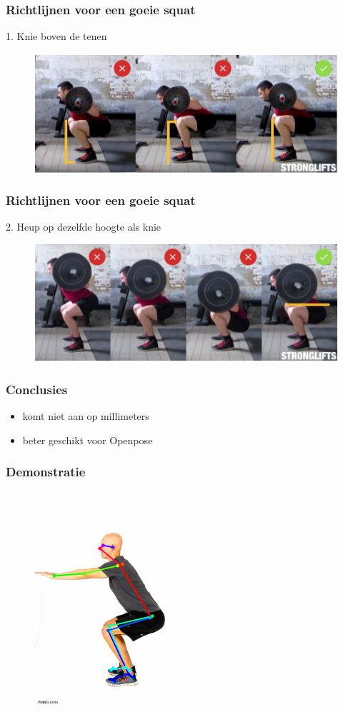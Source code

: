 \documentclass
   [kulak] %
   {kulakbeamer}
\begin{document}
\begin{frame}
	\frametitle{Richtlijnen voor een goeie squat}
	1. Knie boven de tenen
	\begin{figure}
		\includegraphics[width= \textwidth]{squat_knie}
	\end{figure}
\end{frame}

\begin{frame}
\frametitle{Richtlijnen voor een goeie squat}
2. Heup op dezelfde hoogte als knie
\begin{figure}
	\includegraphics[width= \textwidth]{squat_heup}
\end{figure}
\end{frame}

\begin{frame}
	\frametitle{Conclusies}
	\begin{itemize}
		\item komt niet aan op millimeters
		\item beter geschikt voor Openpose
	\end{itemize}
\end{frame}

\begin{frame}
	\frametitle{Demonstratie}
	\begin{figure}
		\includegraphics[width= .4\textwidth]{squat_HPE}
	\end{figure}
\end{frame}
\end{document}
